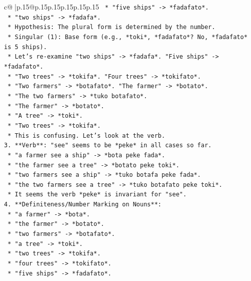 \documentclass{article}
\begin{document}
{\begin{supertabular}{c@{$\;$}|p{.15\linewidth}@{}p{.15\linewidth}p{.15\linewidth}p{.15\linewidth}p{.15\linewidth}p{.15\linewidth}}
{{{\texttt{        *   "five ships" {-}> *fadafato*.} \\
\texttt{        *   "two ships" {-}> *fadafa*.} \\
\texttt{    *   Hypothesis: The plural form is determined by the number.} \\
\texttt{        *   Singular (1): Base form (e.g., *toki*, *fadafato*? No, *fadafato* is 5 ships).} \\
\texttt{        *   Let's re{-}examine "two ships" {-}> *fadafa*. "Five ships" {-}> *fadafato*.} \\
\texttt{        *   "Two trees" {-}> *tokifa*. "Four trees" {-}> *tokifato*.} \\
\texttt{        *   "Two farmers" {-}> *botafato*. "The farmer" {-}> *botato*.} \\
\texttt{        *   "The two farmers" {-}> *tuko botafato*.} \\
\texttt{        *   "The farmer" {-}> *botato*.} \\
\texttt{        *   "A tree" {-}> *toki*.} \\
\texttt{        *   "Two trees" {-}> *tokifa*.} \\
\texttt{    *   This is confusing. Let's look at the verb.} \\
\texttt{3.  **Verb**: "see" seems to be *peke* in all cases so far.} \\
\texttt{    *   "a farmer see a ship" {-}> *bota peke fada*.} \\
\texttt{    *   "the farmer see a tree" {-}> *botato peke toki*.} \\
\texttt{    *   "two farmers see a ship" {-}> *tuko botafa peke fada*.} \\
\texttt{    *   "the two farmers see a tree" {-}> *tuko botafato peke toki*.} \\
\texttt{    *   It seems the verb *peke* is invariant for "see".} \\
\texttt{4.  **Definiteness/Number Marking on Nouns**:} \\
\texttt{    *   "a farmer" {-}> *bota*.} \\
\texttt{    *   "the farmer" {-}> *botato*.} \\
\texttt{    *   "two farmers" {-}> *botafato*.} \\
\texttt{    *   "a tree" {-}> *toki*.} \\
\texttt{    *   "two trees" {-}> *tokifa*.} \\
\texttt{    *   "four trees" {-}> *tokifato*.} \\
\texttt{    *   "five ships" {-}> *fadafato*.} \\
}}}
\end{supertabular}}
\end{document}

